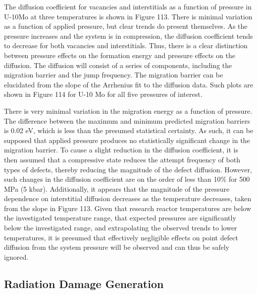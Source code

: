 \documentclass[11pt, oneside]{elsarticle}
\begin{document}
The diffusion coefficient for vacancies and interstitials as a function of pressure in U-10Mo at three temperatures is shown in Figure 113. There is minimal variation as a function of applied pressure, but clear trends do present themselves. As the pressure increases and the system is in compression, the diffusion coefficient tends to decrease for both vacancies and interstitials. Thus, there is a clear distinction between pressure effects on the formation energy and pressure effects on the diffusion. The diffusion will consist of a series of components, including the migration barrier and the jump frequency.  The migration barrier can be elucidated from the slope of the Arrhenius fit to the diffusion data. Such plots are shown in Figure 114 for U-10 Mo for all five pressures of interest. 

There is very minimal variation in the migration energy as a function of pressure. The difference between the maximum and minimum predicted migration barriers is 0.02 eV, which is less than the presumed statistical certainty. As such, it can be supposed that applied pressure produces no statistically significant change in the migration barrier. To cause a slight reduction in the diffusion coefficient, it is then assumed that a compressive state reduces the attempt frequency of both types of defects, thereby reducing the magnitude of the defect diffusion. However, such changes in the diffusion coefficient are on the order of less than 10\% for 500 MPa (5 kbar). Additionally, it appears that the magnitude of the pressure dependence on interstitial diffusion decreases as the temperature decreases, taken from the slope in Figure 113. Given that research reactor temperatures are below the investigated temperature range, that expected pressures are significantly below the investigated range, and extrapolating the observed trends to lower temperatures, it is presumed that effectively negligible effects on point defect diffusion from the system pressure will be observed and can thus be safely ignored. 



\subsection{Radiation Damage Generation}
\end{document}

